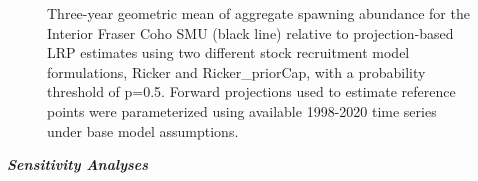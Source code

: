\documentclass[11pt]{book}
\begin{document}
\begin{figure}[htb]

{\centering {} 

}

\caption{Three-year geometric mean of aggregate spawning abundance for the Interior Fraser Coho SMU (black line) relative to projection-based LRP estimates using two different stock recruitment model formulations, Ricker and Ricker\_priorCap, with a probability threshold of p=0.5. Forward projections used to estimate reference points were parameterized using available 1998-2020 time series under base model assumptions.}\label{fig:coho-AggEscpSeries-wProjLRP}
\end{figure}
\linebreak

\textbf{\emph{Sensitivity Analyses}}
\end{document}
